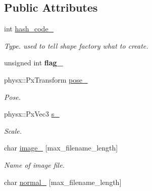 \subsection*{\-Public \-Attributes}
\begin{DoxyCompactItemize}
\item 
\hypertarget{classNeb_1_1Shape_1_1Raw_ae0b91604903325bf6047dd4925c161e8}{int \hyperlink{classNeb_1_1Shape_1_1Raw_ae0b91604903325bf6047dd4925c161e8}{hash\-\_\-code\-\_\-}}\label{classNeb_1_1Shape_1_1Raw_ae0b91604903325bf6047dd4925c161e8}

\begin{DoxyCompactList}\small\item\em \-Type. used to tell shape factory what to create. \end{DoxyCompactList}\item 
\hypertarget{classNeb_1_1Shape_1_1Raw_a82ad86a170c5280bc618f79759d28395}{unsigned int {\bfseries flag\-\_\-}}\label{classNeb_1_1Shape_1_1Raw_a82ad86a170c5280bc618f79759d28395}

\item 
\hypertarget{classNeb_1_1Shape_1_1Raw_a4cc2fcb9e81c238a3d500db1b5d20f9f}{physx\-::\-Px\-Transform \hyperlink{classNeb_1_1Shape_1_1Raw_a4cc2fcb9e81c238a3d500db1b5d20f9f}{pose\-\_\-}}\label{classNeb_1_1Shape_1_1Raw_a4cc2fcb9e81c238a3d500db1b5d20f9f}

\begin{DoxyCompactList}\small\item\em \-Pose. \end{DoxyCompactList}\item 
\hypertarget{classNeb_1_1Shape_1_1Raw_a19f3eea941f04510b8b9dfcc38d453aa}{physx\-::\-Px\-Vec3 \hyperlink{classNeb_1_1Shape_1_1Raw_a19f3eea941f04510b8b9dfcc38d453aa}{s\-\_\-}}\label{classNeb_1_1Shape_1_1Raw_a19f3eea941f04510b8b9dfcc38d453aa}

\begin{DoxyCompactList}\small\item\em \-Scale. \end{DoxyCompactList}\item 
\hypertarget{classNeb_1_1Shape_1_1Raw_ac868d3e6b52bd1cdca2a19d21e9d030c}{char \hyperlink{classNeb_1_1Shape_1_1Raw_ac868d3e6b52bd1cdca2a19d21e9d030c}{image\-\_\-} \mbox{[}max\-\_\-filename\-\_\-length\mbox{]}}\label{classNeb_1_1Shape_1_1Raw_ac868d3e6b52bd1cdca2a19d21e9d030c}

\begin{DoxyCompactList}\small\item\em \-Name of image file. \end{DoxyCompactList}\item 
\hypertarget{classNeb_1_1Shape_1_1Raw_a8d5db26dbd8b92368a4a0e024053d134}{char \hyperlink{classNeb_1_1Shape_1_1Raw_a8d5db26dbd8b92368a4a0e024053d134}{normal\-\_\-} \mbox{[}max\-\_\-filename\-\_\-length\mbox{]}}\label{classNeb_1_1Shape_1_1Raw_a8d5db26dbd8b92368a4a0e024053d134}


\end{DoxyCompactItemize}
